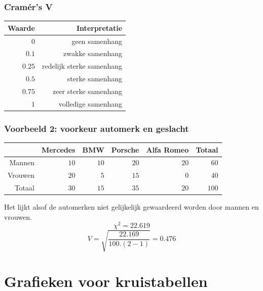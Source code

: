 \documentclass[aspectratio=169]{beamer}
\begin{document}
\begin{frame}
  \frametitle{Cramér's V}
  
  
  \begin{table}[h] \centering
    \begin{tabular}{@{}rr@{}} \toprule
      Waarde & Interpretatie \\
      \midrule
      $0$ & geen samenhang \\
      $0.1$ &  zwakke samenhang \\
      $0.25$ & redelijk sterke samenhang \\
      $0.5$ & sterke samenhang \\
      $0.75$ & zeer sterke samenhang \\
      $1$ & volledige samenhang \\
      \bottomrule
    \end{tabular}
  \end{table}
\end{frame}

\begin{frame}
  \frametitle{Voorbeeld 2: voorkeur automerk en geslacht}
  \begin{table}[h] \centering
    \begin{tabular}{@{}rrrrrr@{}} \toprule
      & Mercedes & BMW & Porsche& Alfa Romeo & Totaal \\
      \midrule
      Mannen  & $10$ & $10$ & $20$ & $20$ & $60$ \\
      Vrouwen & $20$ & $5$  & $15$ & $0$  & $40$ \\
      Totaal  & $30$ & $15$ & $35$ & $20$ & $100$ \\
      \bottomrule
    \end{tabular}
  \end{table}
  Het lijkt alsof de automerken niet gelijkelijk gewaardeerd worden door mannen en vrouwen.
  \[ \chi^{2} = 22.619 \]
  \[ V = \sqrt{\frac{22.169}{100 . (2-1)}}  = 0.476\]
\end{frame}

\section{Grafieken voor kruistabellen}
\end{document}
